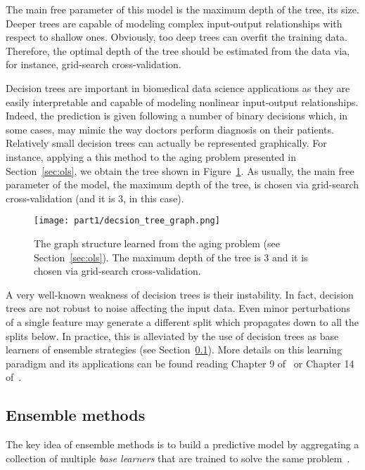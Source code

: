 		The main free parameter of this model is the maximum depth of the tree, \ie its size. Deeper trees are capable of modeling complex input-output relationships with respect to shallow ones. Obviously, too deep trees can overfit the training data. Therefore, the optimal depth of the tree should be estimated from the data via, for instance, grid-search cross-validation.
				
		Decision trees are important in biomedical data science applications as they are easily interpretable and capable of modeling nonlinear input-output relationships. Indeed, the prediction is given following a number of binary decisions which, in some cases, may mimic the way doctors perform diagnosis on their patients. Relatively small decision trees can actually be represented graphically. For instance, applying a this method to the aging problem presented in Section~\ref{sec:ols}, we obtain the tree shown in Figure~\ref{fig:tree_graph}. As usually, the main free parameter of the model, \ie the maximum depth of the tree,  is chosen via grid-search cross-validation (and it is $3$, in this case).
		
		\begin{figure}[]
			\centering
			\texttt{[image: part1/decsion\_tree\_graph.png]}
			\caption{The graph structure learned from the aging problem (see Section~\ref{sec:ols}). The maximum depth of the tree is $3$ and it is chosen via grid-search cross-validation.} \label{fig:tree_graph}
		\end{figure}
	
		A very well-known weakness of decision trees is their instability. In fact, decision trees are not robust to noise affecting the input data. Even minor perturbations of a single feature may generate a different split which propagates down to all the splits below. In practice, this is alleviated by the use of decision trees as base learners of ensemble strategies (see Section~\ref{sec:ensemble_methods}).
		More details on this learning paradigm and its applications can be found reading Chapter 9 of~\cite{hastie2009elements} or Chapter 14 of~\cite{bishop2006pattern}.

	    \subsection{Ensemble methods} \label{sec:ensemble_methods}
	    The key idea of ensemble methods is to build a predictive model by aggregating a collection of multiple \textit{base learners} that are trained to solve the same problem~\citep{zhou2012ensemble}.

